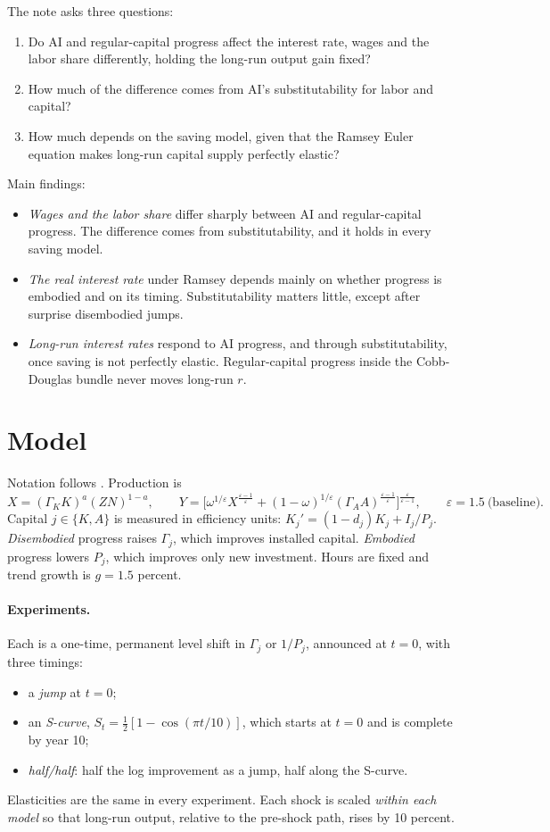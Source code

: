 \documentclass[11pt]{article}
\newcommand{\e}{\varepsilon}
\begin{document}
The note asks three questions:
\begin{enumerate}
\item Do AI and regular-capital progress affect the interest rate, wages and the labor
share differently, holding the long-run output gain fixed?
\item How much of the difference comes from AI's substitutability for labor and capital?
\item How much depends on the saving model, given that the Ramsey Euler equation makes
long-run capital supply perfectly elastic?
\end{enumerate}
Main findings:
\begin{itemize}
\item \emph{Wages and the labor share} differ sharply between AI and regular-capital
progress. The difference comes from substitutability, and it holds in every saving model.
\item \emph{The real interest rate} under Ramsey depends mainly on whether progress is
embodied and on its timing. Substitutability matters little, except after surprise
disembodied jumps.
\item \emph{Long-run interest rates} respond to AI progress, and through substitutability,
once saving is not perfectly elastic. Regular-capital progress inside the Cobb-Douglas
bundle never moves long-run $r$.
\end{itemize}

\section{Model}

Notation follows \citet{kiley2000}. Production is
\begin{equation*}
X=(\Gamma_KK)^a(ZN)^{1-a},\qquad
Y=\Big[\omega^{1/\e}X^{\frac{\e-1}{\e}}+(1-\omega)^{1/\e}(\Gamma_AA)^{\frac{\e-1}{\e}}\Big]^{\frac{\e}{\e-1}},
\qquad \e=1.5\ \text{(baseline)}.
\end{equation*}
Capital $j\in\{K,A\}$ is measured in efficiency units: $K_j'=(1-d_j)K_j+I_j/P_j$.
\emph{Disembodied} progress raises $\Gamma_j$, which improves installed capital.
\emph{Embodied} progress lowers $P_j$, which improves only new investment. Hours are
fixed and trend growth is $g=1.5$ percent.

\paragraph{Experiments.} Each is a one-time, permanent level shift in $\Gamma_j$ or $1/P_j$,
announced at $t=0$, with three timings:
\begin{itemize}
\item a \emph{jump} at $t=0$;
\item an \emph{S-curve}, $S_t=\tfrac12[1-\cos(\pi t/10)]$, which starts at $t=0$ and is complete by year 10;
\item \emph{half/half}: half the log improvement as a jump, half along the S-curve.
\end{itemize}
Elasticities are the same in every experiment. Each shock is scaled \emph{within each
model} so that long-run output, relative to the pre-shock path, rises by 10 percent.
\end{document}
